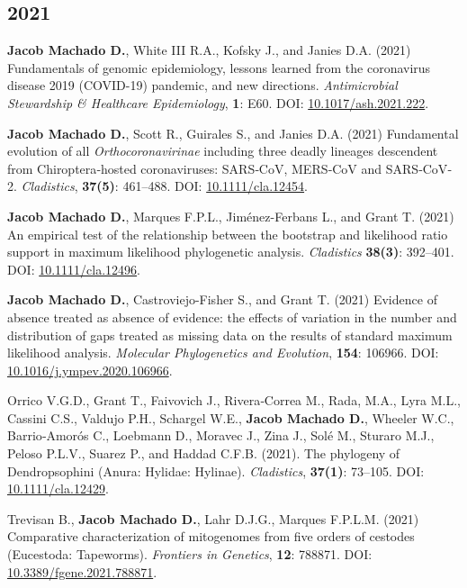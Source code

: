 \documentclass[11pt, letterpaper, sans]{moderncv}
\begin{document}
\subsection{2021}

    {\setlength{\parskip}{.5em}\renewcommand{\baselinestretch}{2.0}\begin{hangparas}{.25in}{1}

		\textbf{Jacob Machado D.}, White III R.A., Kofsky J., and Janies D.A. (2021) Fundamentals of genomic epidemiology, lessons learned from the coronavirus disease 2019 (COVID-19) pandemic, and new directions. \textit{Antimicrobial Stewardship \& Healthcare Epidemiology}, \textbf{1}: E60. DOI: \href{https://doi.org/10.1017/ash.2021.222}{10.1017/ash.2021.222}.

		\textbf{Jacob Machado D.}, Scott R., Guirales S., and Janies D.A. (2021) Fundamental evolution of all \emph{Orthocoronavirinae} including three deadly lineages descendent from Chiroptera‐hosted coronaviruses: SARS‐CoV, MERS‐CoV and SARS‐CoV‐2. \emph{Cladistics}, \textbf{37(5)}: 461--488. DOI: \href{https://doi.org/10.1111/cla.12454}{10.1111/cla.12454}.

		\textbf{Jacob Machado D.}, Marques F.P.L., Jiménez-Ferbans L., and Grant T. (2021) An empirical test of the relationship between the bootstrap and likelihood ratio support in maximum likelihood phylogenetic analysis. \textit{Cladistics} \textbf{38(3)}: 392--401. DOI: \href{https://doi.org/10.1111/cla.12496}{10.1111/cla.12496}.

		\textbf{Jacob Machado D.}, Castroviejo-Fisher S., and Grant T. (2021) Evidence of absence treated as absence of evidence: the effects of variation in the number and distribution of gaps treated as missing data on the results of standard maximum likelihood analysis. \emph{Molecular Phylogenetics and Evolution}, \textbf{154}: 106966. DOI: \href{https://doi.org/10.1016/j.ympev.2020.106966}{10.1016/j.ympev.2020.106966}.

        Orrico V.G.D., Grant T., Faivovich J., Rivera‐Correa M., Rada, M.A., Lyra M.L., Cassini C.S., Valdujo P.H., Schargel W.E., \textbf{Jacob Machado D.}, Wheeler W.C., Barrio‐Amorós C., Loebmann D., Moravec J., Zina J., Solé M., Sturaro M.J., Peloso P.L.V., Suarez P., and Haddad C.F.B. (2021). The phylogeny of Dendropsophini (Anura: Hylidae: Hylinae). \emph{Cladistics}, \textbf{37(1)}: 73--105. DOI: \href{https://doi.org/10.1111/cla.12429}{10.1111/cla.12429}.

        Trevisan B., \textbf{Jacob Machado D.}, Lahr D.J.G., Marques F.P.L.M. (2021) Comparative characterization of mitogenomes from five orders of cestodes (Eucestoda: Tapeworms). \textit{Frontiers in Genetics}, \textbf{12}: 788871. DOI: \href{ https://doi.org/10.3389/fgene.2021.788871}{10.3389/fgene.2021.788871}.

	\end{hangparas}}
\end{document}

